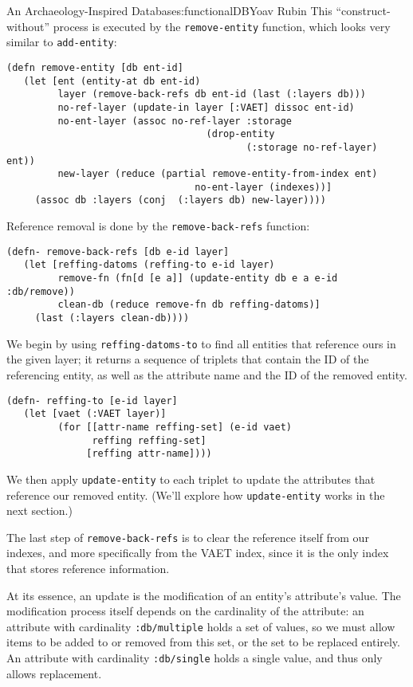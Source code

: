 \begin{aosachapter}{An Archaeology-Inspired Database}{s:functionalDB}{Yoav Rubin}
This ``construct-without'' process is executed by the
\texttt{remove-entity} function, which looks very similar to
\texttt{add-entity}:

\begin{verbatim}
(defn remove-entity [db ent-id]
   (let [ent (entity-at db ent-id)
         layer (remove-back-refs db ent-id (last (:layers db)))
         no-ref-layer (update-in layer [:VAET] dissoc ent-id)
         no-ent-layer (assoc no-ref-layer :storage 
                                   (drop-entity  
                                          (:storage no-ref-layer) ent))
         new-layer (reduce (partial remove-entity-from-index ent) 
                                 no-ent-layer (indexes))]
     (assoc db :layers (conj  (:layers db) new-layer))))
\end{verbatim}

Reference removal is done by the \texttt{remove-back-refs} function:

\begin{verbatim}
(defn- remove-back-refs [db e-id layer]
   (let [reffing-datoms (reffing-to e-id layer)
         remove-fn (fn[d [e a]] (update-entity db e a e-id :db/remove))
         clean-db (reduce remove-fn db reffing-datoms)]
     (last (:layers clean-db))))
\end{verbatim}

We begin by using \texttt{reffing-datoms-to} to find all entities that
reference ours in the given layer; it returns a sequence of triplets
that contain the ID of the referencing entity, as well as the attribute
name and the ID of the removed entity.

\begin{verbatim}
(defn- reffing-to [e-id layer]
   (let [vaet (:VAET layer)]
         (for [[attr-name reffing-set] (e-id vaet)
               reffing reffing-set]
              [reffing attr-name])))
\end{verbatim}

We then apply \texttt{update-entity} to each triplet to update the
attributes that reference our removed entity. (We'll explore how
\texttt{update-entity} works in the next section.)

The last step of \texttt{remove-back-refs} is to clear the reference
itself from our indexes, and more specifically from the VAET index,
since it is the only index that stores reference information.

\label{updating-an-entity}

At its essence, an update is the modification of an entity's attribute's
value. The modification process itself depends on the cardinality of the
attribute: an attribute with cardinality \texttt{:db/multiple} holds a
set of values, so we must allow items to be added to or removed from
this set, or the set to be replaced entirely. An attribute with
cardinality \texttt{:db/single} holds a single value, and thus only
allows replacement.


\end{aosachapter}
